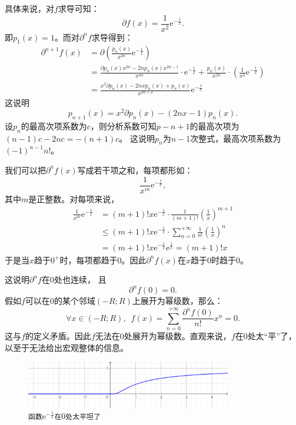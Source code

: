 \documentclass[12pt,UTF8]{ctexbook}
\begin{document}
\begin{appendix}
具体来说，对$f$求导可知：
$$ \partial f(x) = \frac{1}{x^{2}} \mathrm{e}^{-\frac{1}{x}}. $$
即$p_1(x) = 1$。而对$\partial^n f$求导得到：
\begin{align*}
    \partial^{n+1} f(x) &= \partial \left(\frac{p_n(x)}{x^{2n}} \mathrm{e}^{-\frac{1}{x}}\right) \\
    &= \frac{\partial p_n(x) x^{2n} - 2n p_n(x) x^{2n-1}}{x^{4n}} \cdot \mathrm{e}^{-\frac{1}{x}} + \frac{p_n(x)}{x^{2n}} \cdot \left( \frac{1}{x^{2}} \mathrm{e}^{-\frac{1}{x}}\right) \\
    &= \frac{x^2 \partial p_n(x) - 2nx p_n(x) + p_n(x)}{x^{2n+2}} \mathrm{e}^{-\frac{1}{x}}
\end{align*}
这说明
$$ p_{n+1}(x) = x^2 \partial p_n(x) - (2nx - 1)p_n(x).$$
设$p_n$的最高次项系数为$c$，则分析系数可知$p-{n+1}$的最高次项为$(n-1)c - 2nc = -(n+1)c$。
这说明$p_n$为$n-1$次整式，最高次项系数为$(-1)^{n-1}n!$。

我们可以把$\partial^n f(x)$写成若干项之和，每项都形如：
$$ \frac{1}{x^m} \mathrm{e}^{-\frac{1}{x}},$$
其中$m$是正整数。对每项来说，
\begin{align*}
    \frac{1}{x^m} \mathrm{e}^{-\frac{1}{x}} &= (m+1)!x \mathrm{e}^{-\frac{1}{x}} \cdot \frac{1}{(m+1)!} \left(\frac{1}{x}\right)^{m+1} \\
    &\leqslant (m+1)!x \mathrm{e}^{-\frac{1}{x}} \cdot \sum_{n=0}^{+\infty} \frac{1}{n!} \left(\frac{1}{x}\right)^n \\
    &= (m+1)!x \mathrm{e}^{-\frac{1}{x}} \mathrm{e}^{\frac{1}{x}} = (m+1)!x
\end{align*}
于是当$x$趋于$0^+$时，每项都趋于$0$。因此$\partial^n f(x)$在$x$趋于$0$时趋于$0$。

这说明$\partial^n f$在$0$处也连续，
且
$$ \partial^n f(0) = 0.$$
假如$f$可以在$0$的某个邻域$(-R;R)$上展开为幂级数，那么：
$$ \forall x \in (-R;R) ,\,\,\, f(x) = \sum_{n=0}^{+\infty} \frac{\partial^n f(0)}{n!} x^n = 0. $$
这与$f$的定义矛盾。因此$f$无法在$0$处展开为幂级数。直观来说，$f$在$0$处太“平”了，以至于无法给出宏观整体的信息。

\begin{figure}[h] %
    \centering
    \includegraphics[width=0.8\textwidth]{tu/幂级数2.png}
    \caption*{\texttt{函数}$\displaystyle \mathrm{e}^{-\frac{1}{x}}$\texttt{在}$0$\texttt{处太平坦了}}
\end{figure}


\end{appendix}
\end{document}
